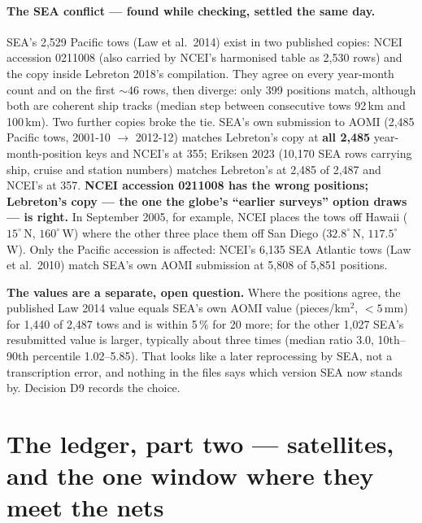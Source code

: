 \documentclass[10pt]{article}
\begin{document}
\paragraph{The SEA conflict --- found while checking, settled the same day.} SEA's 2,529 Pacific tows
(Law et al.\ 2014) exist in two published copies: NCEI accession 0211008 (also carried by NCEI's harmonised table
as 2,530 rows) and the copy inside Lebreton 2018's compilation. They agree on every year-month count and on the
first $\sim 46$ rows, then diverge: only 399 positions match, although both are coherent ship tracks (median step
between consecutive tows 92\,km and 100\,km). Two further copies broke the tie. SEA's own submission to AOMI
(2,485 Pacific tows, 2001-10 $\to$ 2012-12) matches Lebreton's copy at \textbf{all 2,485} year-month-position keys
and NCEI's at 355; Eriksen 2023 (10,170 SEA rows carrying ship, cruise and station numbers) matches Lebreton's at
2,485 of 2,487 and NCEI's at 357. \textbf{NCEI accession 0211008 has the wrong positions; Lebreton's copy --- the
one the globe's ``earlier surveys'' option draws --- is right.} In September 2005, for example, NCEI places the
tows off Hawaii ($15^\circ$\,N, $160^\circ$\,W) where the other three place them off San Diego ($32.8^\circ$\,N,
$117.5^\circ$\,W). Only the Pacific accession is affected: NCEI's 6,135 SEA Atlantic tows (Law et al.\ 2010) match
SEA's own AOMI submission at 5,808 of 5,851 positions.

\textbf{The values are a separate, open question.} Where the positions agree, the published Law 2014 value equals
SEA's own AOMI value (pieces/km$^2$, $<5$\,mm) for 1,440 of 2,487 tows and is within 5\,\% for 20 more; for the
other 1,027 SEA's resubmitted value is larger, typically about three times (median ratio 3.0, 10th--90th
percentile 1.02--5.85). That looks like a later reprocessing by SEA, not a transcription error, and nothing in the
files says which version SEA now stands by. Decision D9 records the choice.

\section{The ledger, part two --- satellites, and the one window where they meet the nets}
\end{document}
